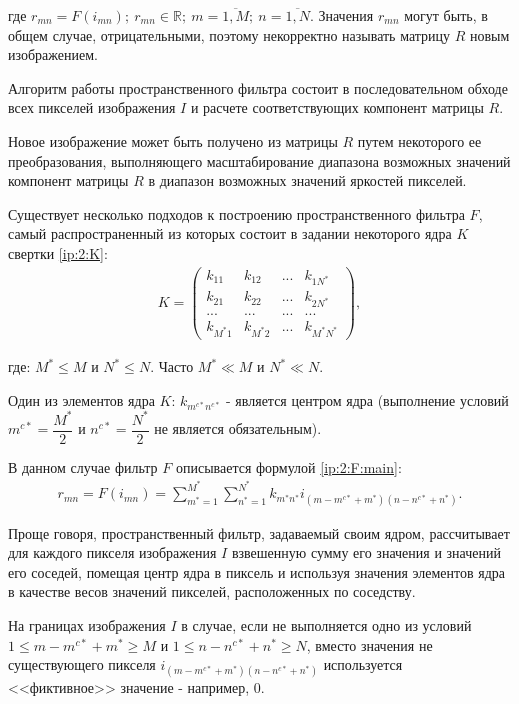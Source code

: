 где $r_{mn} = F(i_{mn}) ;~ r_{mn} \in \mathbb{R} ;~ m = \overline{1, M} ;~ n = \overline{1, N}$. Значения $r_{mn}$ могут быть, в общем случае, отрицательными, поэтому некорректно называть матрицу $R$ новым изображением.

Алгоритм работы пространственного фильтра состоит в последовательном обходе всех пикселей изображения $I$ и расчете соответствующих компонент матрицы $R$.

Новое изображение может быть получено из матрицы $R$ путем некоторого ее преобразования, выполняющего масштабирование диапазона возможных значений компонент матрицы $R$ в диапазон возможных значений яркостей пикселей.

Существует несколько подходов к построению пространственного фильтра $F$, самый распространенный из которых состоит в задании некоторого ядра $K$ свертки \eqref{ip:2:K}:
\begin{gather}
	\label{ip:2:K}
	K = \left(
	\begin{array}{cccc}
		k_{11} & k_{12} & ... & k_{1N^*}\\
		k_{21} & k_{22} & ... & k_{2N^*}\\
		... & ... & ... & ...\\
		k_{M^*1} & k_{M^*2} & ... & k_{M^*N^*}
	\end{array}
	\right),
\end{gather}

где: $M^* \le M$ и $N^* \le N$. Часто $M^* \ll M$ и $N^* \ll N$.

Один из элементов ядра $K$: $k_{m^{c*} n^{c*}}$ - является центром ядра (выполнение условий $m^{c*} = \dfrac{M^*}{2}$ и $n^{c*} = \dfrac{N^*}{2}$ не является обязательным).

В данном случае фильтр $F$ описывается формулой \eqref{ip:2:F:main}:
\begin{gather}
	\label{ip:2:F:main}
	r_{mn} = F(i_{mn}) = \sum_{m^* = 1}^{M^*} \sum_{n^* = 1}^{N^*} k_{m^* n^*} i_{(m - m^{c*} + m^*) (n - n^{c*} + n^*)}.
\end{gather}

Проще говоря, пространственный фильтр, задаваемый своим ядром, рассчитывает для каждого пикселя изображения $I$ взвешенную сумму его значения и значений его соседей, помещая центр ядра в пиксель и используя значения элементов ядра в качестве весов значений пикселей, расположенных по соседству.

На границах изображения $I$ в случае, если не выполняется одно из условий $1 \le m - m^{c*} + m^* \ge M$ и $1 \le n - n^{c*} + n^* \ge N$, вместо значения не существующего пикселя $i_{(m - m^{c*} + m^*) (n - n^{c*} + n^*)}$ используется <<фиктивное>> значение - например, 0.

